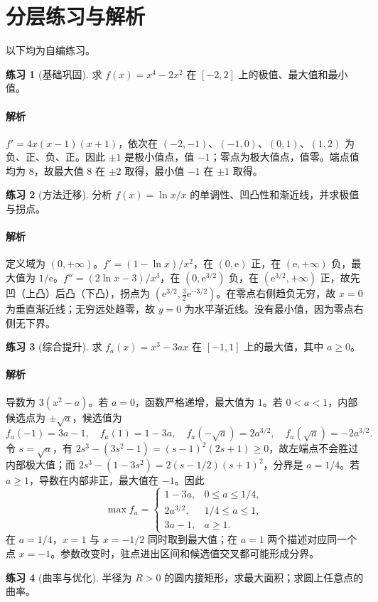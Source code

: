 \documentclass[UTF8,fontset=fandol,12pt,oneside,openany]{ctexrep}
\newcommand{\ee}{\mathrm e}
\theoremstyle{definition}
\newtheorem{exercise}{练习}[chapter]
\begin{document}
\section{分层练习与解析}
以下均为自编练习。
\begin{exercise}[基础巩固]
求 $f(x)=x^4-2x^2$ 在 $[-2,2]$ 上的极值、最大值和最小值。
\end{exercise}
\paragraph{解析}$f'=4x(x-1)(x+1)$，依次在 $(-2,-1)$、$(-1,0)$、$(0,1)$、$(1,2)$ 为负、正、负、正。因此 $\pm1$ 是极小值点，值 $-1$；零点为极大值点，值零。端点值均为 $8$，故最大值 $8$ 在 $\pm2$ 取得，最小值 $-1$ 在 $\pm1$ 取得。
\begin{exercise}[方法迁移]
分析 $f(x)=\ln x/x$ 的单调性、凹凸性和渐近线，并求极值与拐点。
\end{exercise}
\paragraph{解析}定义域为 $(0,+\infty)$。$f'=(1-\ln x)/x^2$，在 $(0,\ee)$ 正，在 $(\ee,+\infty)$ 负，最大值为 $1/\ee$。$f''=(2\ln x-3)/x^3$，在 $(0,\ee^{3/2})$ 负，在 $(\ee^{3/2},+\infty)$ 正，故先凹（上凸）后凸（下凸），拐点为 $(\ee^{3/2},\tfrac32\ee^{-3/2})$。在零点右侧趋负无穷，故 $x=0$ 为垂直渐近线；无穷远处趋零，故 $y=0$ 为水平渐近线。没有最小值，因为零点右侧无下界。
\begin{exercise}[综合提升]
求 $f_a(x)=x^3-3ax$ 在 $[-1,1]$ 上的最大值，其中 $a\ge0$。
\end{exercise}
\paragraph{解析}导数为 $3(x^2-a)$。若 $a=0$，函数严格递增，最大值为 $1$。若 $0<a<1$，内部候选点为 $\pm\sqrt a$，候选值为
\[f_a(-1)=3a-1,\quad f_a(1)=1-3a,\quad f_a(-\sqrt a)=2a^{3/2},\quad f_a(\sqrt a)=-2a^{3/2}.\]
令 $s=\sqrt a$，有 $2s^3-(3s^2-1)=(s-1)^2(2s+1)\ge0$，故左端点不会胜过内部极大值；而 $2s^3-(1-3s^2)=2(s-1/2)(s+1)^2$，分界是 $a=1/4$。若 $a\ge1$，导数在内部非正，最大值在 $-1$。因此
\[\max f_a=\begin{cases}1-3a,&0\le a\le1/4,\\2a^{3/2},&1/4\le a\le1,\\3a-1,&a\ge1.\end{cases}\]
在 $a=1/4$，$x=1$ 与 $x=-1/2$ 同时取到最大值；在 $a=1$ 两个描述对应同一个点 $x=-1$。参数改变时，驻点进出区间和候选值交叉都可能形成分界。
\begin{exercise}[曲率与优化]
半径为 $R>0$ 的圆内接矩形，求最大面积；求圆上任意点的曲率。
\end{exercise}
\end{document}
